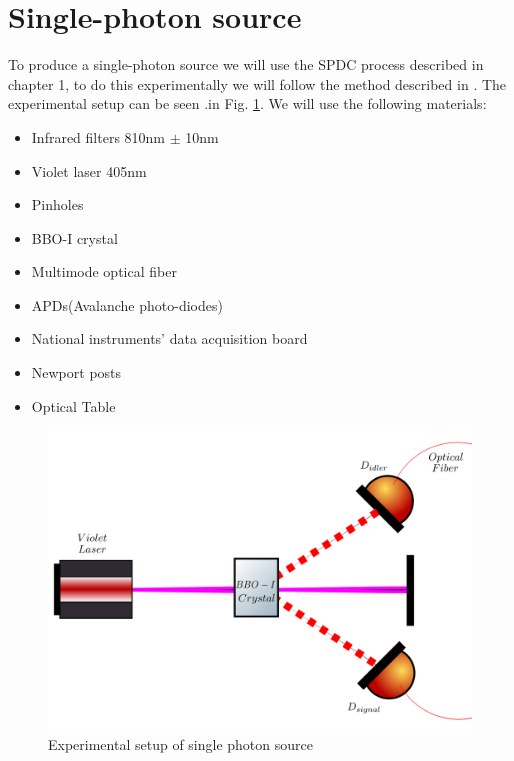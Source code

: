 \documentclass[12pt]{book}
\begin{document}
\section{Single-photon source}


To produce a single-photon source we will use the SPDC process described in chapter 1, to do this experimentally we will follow the method described in \cite{maestria_procopio}. The experimental setup can be seen .in Fig. \ref{single}.  We will use the following materials:



\begin{itemize}


\item Infrared filters 810nm $\pm$ 10nm
\item Violet laser 405nm
\item Pinholes
\item BBO-I crystal
\item Multimode optical fiber
\item APDs(Avalanche photo-diodes)
\item National instruments' data acquisition board
\item Newport posts
\item Optical Table

\end{itemize}

\begin{figure}[H]
\centering
\includegraphics[width=\linewidth]{images/SPDC_exp.png}
\caption{Experimental setup of single photon source}
\label{single}
\end{figure}
\end{document}
